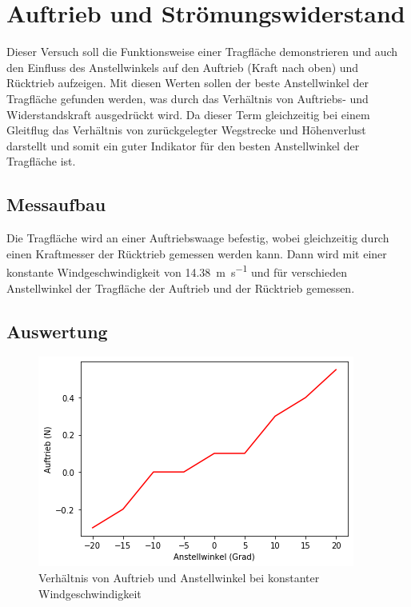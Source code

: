 \section{Auftrieb und Strömungswiderstand}

Dieser Versuch soll die Funktionsweise einer Tragfläche demonstrieren und auch den Einfluss des Anstellwinkels auf den Auftrieb (Kraft nach oben) und Rücktrieb aufzeigen. Mit diesen Werten sollen der beste Anstellwinkel der Tragfläche gefunden werden, was durch das Verhältnis von Auftriebs- und Widerstandskraft ausgedrückt wird. Da dieser Term gleichzeitig bei einem Gleitflug das Verhältnis von zurückgelegter Wegstrecke und Höhenverlust darstellt und somit ein guter Indikator für den besten Anstellwinkel der Tragfläche ist.

\subsection{Messaufbau}

Die Tragfläche wird an einer Auftriebswaage befestig, wobei gleichzeitig durch einen Kraftmesser der Rücktrieb gemessen werden kann. Dann wird mit einer konstante Windgeschwindigkeit von \SI{14.38}{\metre\per\second} und für verschieden Anstellwinkel der Tragfläche der Auftrieb und der Rücktrieb gemessen.

\clearpage

\subsection{Auswertung}

\begin{figure}[h!]
    \centering
    \includegraphics[scale=0.8]{Aeromechanik/Protokoll/fig/Aeromechanik Versuch 3.11.png}
    \caption{Verhältnis von Auftrieb und Anstellwinkel bei konstanter Windgeschwindigkeit}
    \label{fig:Aeoromechanik Versuch 3.11}
\end{figure}

